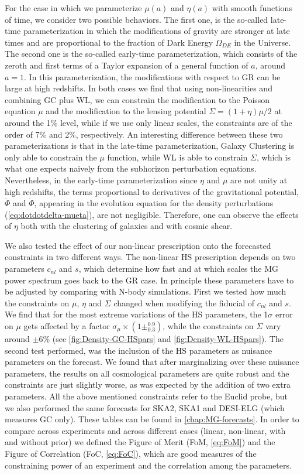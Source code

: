 For the case in which we parameterize $\mu(a)$ and $\eta(a)$ with smooth functions of time, we consider two possible behaviors. The first one, is the so-called
late-time parameterization in which the modifications of gravity are stronger at late times and are proportional to the fraction of Dark Energy
$\Omega_{DE}$ in the Universe. The second one is the so-called early-time parameterization, which consists of the zeroth and first terms of a Taylor expansion
of a general function of $a$, around $a=1$. In this parameterization, the modifications with respect to GR can be large at high redshifts.
In both cases we find that using non-linearities and combining GC plus WL, we can constrain the modification to the Poisson equation $\mu$
and the modification to the lensing potential $\Sigma=(1+\eta)\mu/2$ at around the 1\% level, while if we use only linear
scales, the constraints are of the order of 7\% and 2\%, respectively.
An interesting difference between these two parameterizations is that in the late-time parameterization, Galaxy Clustering is only able
to constrain the $\mu$ function, while WL is able to constrain $\Sigma$, which is what one expects naively from
the subhorizon perturbation equations. Nevertheless, in the early-time parameterization since $\eta$ and $\mu$ are not unity at high redshifts,
the terms proportional to derivatives of the gravitational potential, $\dot \Phi $ and $\ddot \Phi$, appearing in the evolution equation
for the density perturbations (\cref{eq:dotdotdelta-mueta}), are not negligible. Therefore, one can observe the effects of $\eta$ both with the clustering of galaxies 
and with cosmic shear.

We also tested the effect of our non-linear prescription onto the forecasted constraints in two different ways. The non-linear HS
prescription depends on two parameters $c_{nl}$ and $s$, which determine how fast and at which scales the MG power spectrum
goes back to the GR case. In principle these parameters have to be adjusted by comparing with N-body simulations. First we tested how much the constraints 
on $\mu$, $\eta$ and $\Sigma$ changed when  modifying the fiducial of $c_{nl}$ and $s$. We find that for the most extreme variations
of the HS parameters, the 1$\sigma$ error on $\mu$ gets affected by a factor $\sigma_{\mu} \times (1\pm^{0.9}_{0.3})$, while the constraints on $\Sigma$ vary around $\pm 6\%$
(see \cref{fig:Density-GC-HSpars} and \cref{fig:Density-WL-HSpars}).
The second test performed, was the inclusion of the HS parameters as nuisance parameters on the forecast. 
We found that after marginalizing over these nuisance parameters, the results on all cosmological parameters are quite robust and the constraints are just slightly worse, as was expected by the addition
of two extra parameters.
All the above mentioned constraints refer to the Euclid probe, but we also performed the same forecasts for SKA2, SKA1 and DESI-ELG (which measures GC only). These tables can be found in \cref{chap:MG-forecasts}.
In order to compare across experiments and across different cases (linear, non-linear, with and without prior) we defined the Figure of Merit (FoM, \cref{eq:FoM})
and the Figure of Correlation (FoC, \cref{eq:FoC}), which are good measures of the constraining power of an experiment and the correlation among the parameters.

